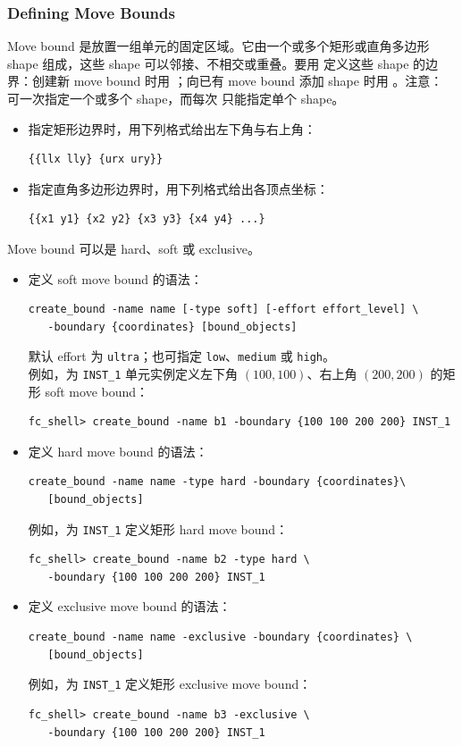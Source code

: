 \subsubsection*{Defining Move Bounds}

Move bound 是放置一组单元的固定区域。它由一个或多个矩形或直角多边形 shape 组成，这些 shape 可以邻接、不相交或重叠。要用  定义这些 shape 的边界：创建新 move bound 时用 ；向已有 move bound 添加 shape 时用 。注意： 可一次指定一个或多个 shape，而每次  只能指定单个 shape。

\begin{itemize}
  \item 指定矩形边界时，用下列格式给出左下角与右上角：
\begin{lstlisting}
{{llx lly} {urx ury}}
\end{lstlisting}
  \item 指定直角多边形边界时，用下列格式给出各顶点坐标：
\begin{lstlisting}
{{x1 y1} {x2 y2} {x3 y3} {x4 y4} ...}
\end{lstlisting}
\end{itemize}

Move bound 可以是 hard、soft 或 exclusive。
\begin{itemize}
  \item 定义 soft move bound 的语法：
\begin{lstlisting}
create_bound -name name [-type soft] [-effort effort_level] \
   -boundary {coordinates} [bound_objects]
\end{lstlisting}
    默认 effort 为 \texttt{ultra}；也可指定 \texttt{low}、\texttt{medium} 或 \texttt{high}。\\
    例如，为 \texttt{INST\_1} 单元实例定义左下角 $(100, 100)$、右上角 $(200, 200)$ 的矩形 soft move bound：
\begin{lstlisting}
fc_shell> create_bound -name b1 -boundary {100 100 200 200} INST_1
\end{lstlisting}

  \item 定义 hard move bound 的语法：
\begin{lstlisting}
create_bound -name name -type hard -boundary {coordinates}\
   [bound_objects]
\end{lstlisting}
    例如，为 \texttt{INST\_1} 定义矩形 hard move bound：
\begin{lstlisting}
fc_shell> create_bound -name b2 -type hard \
   -boundary {100 100 200 200} INST_1
\end{lstlisting}

  \item 定义 exclusive move bound 的语法：
\begin{lstlisting}
create_bound -name name -exclusive -boundary {coordinates} \
   [bound_objects]
\end{lstlisting}
    例如，为 \texttt{INST\_1} 定义矩形 exclusive move bound：
\begin{lstlisting}
fc_shell> create_bound -name b3 -exclusive \
   -boundary {100 100 200 200} INST_1
\end{lstlisting}
\end{itemize}

